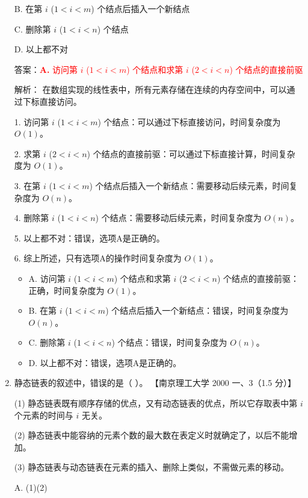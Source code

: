 \documentclass[lang=cn,newtx,10pt,scheme=chinese]{../../../elegantbook}
\begin{document}
\begin{enumerate}
        B. 在第 $i$ ($1 < i < m$) 个结点后插入一个新结点  
    
        C. 删除第 $i$ ($1 < i < n$) 个结点  
    
        D. 以上都不对  

        答案：\textcolor{red}{\textbf{A.} 访问第 $i$ ($1 < i < m$) 个结点和求第 $i$ ($2 < i < n$) 个结点的直接前驱}

        解析：
        在数组实现的线性表中，所有元素存储在连续的内存空间中，可以通过下标直接访问。
        
        1. 访问第 $i$ ($1 < i < m$) 个结点：可以通过下标直接访问，时间复杂度为 $O(1)$。
       
        2. 求第 $i$ ($2 < i < n$) 个结点的直接前驱：可以通过下标直接计算，时间复杂度为 $O(1)$。
      
        3. 在第 $i$ ($1 < i < m$) 个结点后插入一个新结点：需要移动后续元素，时间复杂度为 $O(n)$。
       
        4. 删除第 $i$ ($1 < i < n$) 个结点：需要移动后续元素，时间复杂度为 $O(n)$。
       
        5. 以上都不对：错误，选项A是正确的。
       
        6. 综上所述，只有选项A的操作时间复杂度为 $O(1)$。
        \begin{itemize}
            \item A. 访问第 $i$ ($1 < i < m$) 个结点和求第 $i$ ($2 < i < n$) 个结点的直接前驱：正确，时间复杂度为 $O(1)$。
            \item B. 在第 $i$ ($1 < i < m$) 个结点后插入一个新结点：错误，时间复杂度为 $O(n)$。
            \item C. 删除第 $i$ ($1 < i < n$) 个结点：错误，时间复杂度为 $O(n)$。
            \item D. 以上都不对：错误，选项A是正确的。
        \end{itemize}

        \item 静态链表的叙述中，错误的是（ ）。  
        【南京理工大学 2000 一、3（1.5 分）】  
    
        (1) 静态链表既有顺序存储的优点，又有动态链表的优点，所以它存取表中第 $i$ 个元素的时间与 $i$ 无关。  
    
        (2) 静态链表中能容纳的元素个数的最大数在表定义时就确定了，以后不能增加。  
    
        (3) 静态链表与动态链表在元素的插入、删除上类似，不需做元素的移动。  
    
        A. (1)(2)  
    

\end{enumerate}
\end{document}
